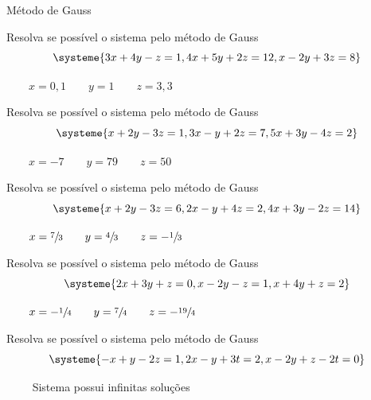 \begin{exercicios}{Método de Gauss}
    \begin{exercicio}
        Resolva se possível o sistema pelo método de Gauss
        \[\systeme{ 3x + 4y -  z = 1,
                    4x + 5y + 2z = 12,
                     x - 2y + 3z = 8}
        \]
        \begin{answers}
            \(\qquad x=0,1 \qquad y=1 \qquad z=3,3 \)
        \end{answers}
    \end{exercicio}
    
    \begin{exercicio}
        Resolva se possível o sistema pelo método de Gauss
        \[\systeme{  x + 2y -3z = 1,
            3x -  y +2z = 7,
            5x + 3y -4z = 2}
        \]
        \begin{answers}
            \(\qquad x=-7 \qquad y=79 \qquad z=50 \)
        \end{answers}
    \end{exercicio}
    
    \begin{exercicio}
        Resolva se possível o sistema pelo método de Gauss
        \[\systeme{  x +2y -3z =  6,
            2x - y +4z =  2,
            4x +3y -2z = 14}
        \]
        \begin{answers}
            \(\qquad x=\sfrac{7}{3} \qquad y=\sfrac{4}{3} \qquad z=-\sfrac{1}{3} \)
        \end{answers}
    \end{exercicio}
    
    \begin{exercicio}
        Resolva se possível o sistema pelo método de Gauss
        \[\systeme{ 2x +3y +z = 0,
            x -2y -z = 1,
            x +4y +z = 2}
        \]
        \begin{answers}
            \(\qquad x=-\sfrac{1}{4} \qquad y=\sfrac{7}{4} \qquad z=-\sfrac{19}{4} \)
        \end{answers}
    \end{exercicio}
    
    \begin{exercicio}
        Resolva se possível o sistema pelo método de Gauss
        \[\systeme{-x + y - 2z      = 1,
            2x - y +      3t = 2,
            x -2y +  z - 2t = 0}
        \]
        \begin{answers}
            \(\qquad \) Sistema possui infinitas soluções
        \end{answers}
    \end{exercicio}
    

\end{exercicios}
